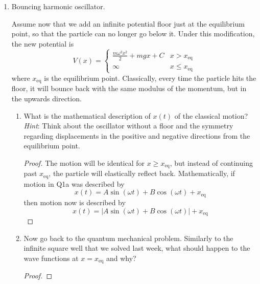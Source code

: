 \documentclass[../psets.tex]{subfiles}
\begin{document}
\begin{enumerate}
\begin{enumerate}
\begin{proof}
\begin{align*}
            \end{align*}
            This  from the value we obtained in the absence of gravity in class on 1/22.
        \end{proof}
    \end{enumerate}
    \item Bouncing harmonic oscillator.\par
    Assume now that we add an infinite potential floor just at the equilibrium point, so that the particle can no longer go below it. Under this modification, the new potential is
    \begin{equation}
        V(x) =
        \begin{cases}
            \frac{m\omega^2x^2}{2}+mgx+C & x>x_\text{eq}\\
            \infty & x\leq x_\text{eq}
        \end{cases}
    \end{equation}
    where $x_\text{eq}$ is the equilibrium point. Classically, every time the particle hits the floor, it will bounce back with the same modulus of the momentum, but in the upwards direction.
    \begin{enumerate}
        \item What is the mathematical description of $x(t)$ of the classical motion? \emph{Hint}: Think about the oscillator without a floor and the symmetry regarding displacements in the positive and negative directions from the equilibrium point.
        \begin{proof}
            The motion will be identical for $x\geq x_\text{eq}$, but instead of continuing past $x_\text{eq}$, the particle will elastically reflect back. Mathematically, if motion in Q1a was described by
            \begin{equation*}
                x(t) = A\sin(\omega t)+B\cos(\omega t)+x_\text{eq}
            \end{equation*}
            then motion now is described by
            \begin{equation*}
                \boxed{x(t) = |A\sin(\omega t)+B\cos(\omega t)|+x_\text{eq}}
            \end{equation*}
        \end{proof}
        \item Now go back to the quantum mechanical problem. Similarly to the infinite square well that we solved last week, what should happen to the wave functions at $x=x_\text{eq}$ and why?
        \begin{proof}

\end{proof}
\end{enumerate}
\end{enumerate}
\end{document}
